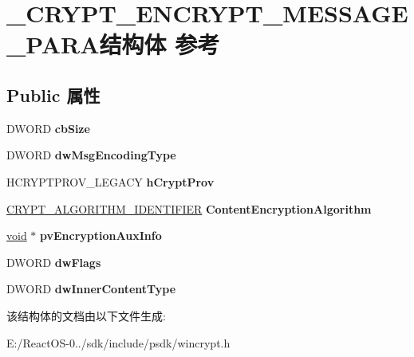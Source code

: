 \hypertarget{struct___c_r_y_p_t___e_n_c_r_y_p_t___m_e_s_s_a_g_e___p_a_r_a}{}\section{\+\_\+\+C\+R\+Y\+P\+T\+\_\+\+E\+N\+C\+R\+Y\+P\+T\+\_\+\+M\+E\+S\+S\+A\+G\+E\+\_\+\+P\+A\+R\+A结构体 参考}
\label{struct___c_r_y_p_t___e_n_c_r_y_p_t___m_e_s_s_a_g_e___p_a_r_a}
\subsection*{Public 属性}
\begin{DoxyCompactItemize}
\item 
\mbox{\label{struct___c_r_y_p_t___e_n_c_r_y_p_t___m_e_s_s_a_g_e___p_a_r_a_a977be8bf639b6ae5da1c38e4d10be443}} 
D\+W\+O\+RD {\bfseries cb\+Size}
\item 
\mbox{\label{struct___c_r_y_p_t___e_n_c_r_y_p_t___m_e_s_s_a_g_e___p_a_r_a_ad3b53dce7b9ac9a37189392b53f26d5b}} 
D\+W\+O\+RD {\bfseries dw\+Msg\+Encoding\+Type}
\item 
\mbox{\label{struct___c_r_y_p_t___e_n_c_r_y_p_t___m_e_s_s_a_g_e___p_a_r_a_a6780918bca93b70515aea9f9cb13ca38}} 
H\+C\+R\+Y\+P\+T\+P\+R\+O\+V\+\_\+\+L\+E\+G\+A\+CY {\bfseries h\+Crypt\+Prov}
\item 
\mbox{\label{struct___c_r_y_p_t___e_n_c_r_y_p_t___m_e_s_s_a_g_e___p_a_r_a_abe368c1d320e7f474aeb2135fca5d3dc}} 
\hyperlink{struct___c_r_y_p_t___a_l_g_o_r_i_t_h_m___i_d_e_n_t_i_f_i_e_r}{C\+R\+Y\+P\+T\+\_\+\+A\+L\+G\+O\+R\+I\+T\+H\+M\+\_\+\+I\+D\+E\+N\+T\+I\+F\+I\+ER} {\bfseries Content\+Encryption\+Algorithm}
\item 
\mbox{\label{struct___c_r_y_p_t___e_n_c_r_y_p_t___m_e_s_s_a_g_e___p_a_r_a_a733437c92132efdcdaef1b0bfcf65b7b}} 
\hyperlink{interfacevoid}{void} $\ast$ {\bfseries pv\+Encryption\+Aux\+Info}
\item 
\mbox{\label{struct___c_r_y_p_t___e_n_c_r_y_p_t___m_e_s_s_a_g_e___p_a_r_a_a1e70a16d686f586d53fb4504e5324f8a}} 
D\+W\+O\+RD {\bfseries dw\+Flags}
\item 
\mbox{\label{struct___c_r_y_p_t___e_n_c_r_y_p_t___m_e_s_s_a_g_e___p_a_r_a_ad7083331a9d3591745fb80514716aa78}} 
D\+W\+O\+RD {\bfseries dw\+Inner\+Content\+Type}
\end{DoxyCompactItemize}


该结构体的文档由以下文件生成\+:\begin{DoxyCompactItemize}
\item 
E\+:/\+React\+O\+S-\/0../sdk/include/psdk/wincrypt.\+h\end{DoxyCompactItemize}
